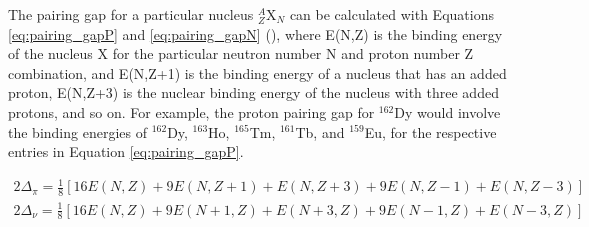 The pairing gap for a particular nucleus $^A_Z$X$_N$ can be calculated with Equations \ref{eq:pairing_gapP} and \ref{eq:pairing_gapN} (\cite{MANG_pairing1965353}), where E(N,Z) is the binding energy of the nucleus X for the particular neutron number N and proton number Z combination, and E(N,Z+1) is the binding energy of a nucleus that has an added proton, E(N,Z+3) is the nuclear binding energy of the nucleus with three added protons, and so on. For example, the proton pairing gap for $^{162}$Dy would involve the binding energies of $^{162}$Dy, $^{163}$Ho, $^{165}$Tm, $^{161}$Tb, and $^{159}$Eu, for the respective entries in Equation \ref{eq:pairing_gapP}.

\begin{align}
2\Delta_{\pi}=\frac{1}{8}[16E(N,Z)+9E(N,Z+1)+E(N,Z+3)+9E(N,Z-1)+E(N,Z-3)] \label{eq:pairing_gapP}\\
2\Delta_{\nu}=\frac{1}{8}[16E(N,Z)+9E(N+1,Z)+E(N+3,Z)+9E(N-1,Z)+E(N-3,Z)] \label{eq:pairing_gapN}
\end{align}

